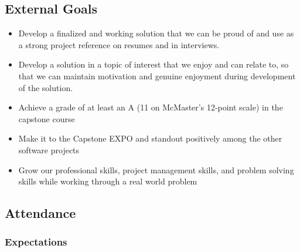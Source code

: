 \documentclass{article}
\begin{document}

\subsection*{External Goals}

\begin{itemize}
    \item Develop a finalized and working solution that we can be proud of and 
    use as a strong project reference on resumes and in interviews.
    \item Develop a solution in a topic of interest that we enjoy and can relate 
    to, so that we can maintain motivation and genuine enjoyment during 
    development of the solution.
    \item Achieve a grade of at least an A (11 on McMaster's 12-point scale) in the capstone course
    \item Make it to the Capstone EXPO and standout positively among the other software projects
    \item Grow our professional skills, project management skills, and problem solving skills while working through a real world problem
\end{itemize}


\subsection*{Attendance}

\subsubsection*{Expectations}
\end{document}
